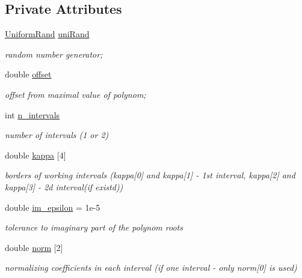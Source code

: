 \subsection*{Private Attributes}
\begin{DoxyCompactItemize}
\item 
\hyperlink{class_p_c_a_1_1_uniform_rand}{Uniform\+Rand} \hyperlink{class_p_c_a_1_1_double_well_rand_a44577274c594e30092748eb446d8dd40}{uni\+Rand}
\begin{DoxyCompactList}\small\item\em random number generator; \end{DoxyCompactList}\item 
double \hyperlink{class_p_c_a_1_1_double_well_rand_abad044e066c9b93b3eacb6d36440f650}{offset}
\begin{DoxyCompactList}\small\item\em offset from maximal value of polynom; \end{DoxyCompactList}\item 
int \hyperlink{class_p_c_a_1_1_double_well_rand_a89c48e652127b71600906d93f628dad5}{n\+\_\+intervals}
\begin{DoxyCompactList}\small\item\em number of intervals (1 or 2) \end{DoxyCompactList}\item 
double \hyperlink{class_p_c_a_1_1_double_well_rand_a4792680466fc8f865be362937b3e4e3b}{kappa} \mbox{[}4\mbox{]}
\begin{DoxyCompactList}\small\item\em borders of working intervals (kappa\mbox{[}0\mbox{]} and kappa\mbox{[}1\mbox{]} -\/ 1st interval, kappa\mbox{[}2\mbox{]} and kappa\mbox{[}3\mbox{]} -\/ 2d interval(if existd)) \end{DoxyCompactList}\item 
double \hyperlink{class_p_c_a_1_1_double_well_rand_a5fa2e0c609851d3e8a8cb9eb4bbd90c6}{im\+\_\+epsilon} = 1e-\/5
\begin{DoxyCompactList}\small\item\em tolerance to imaginary part of the polynom roots \end{DoxyCompactList}\item 
double \hyperlink{class_p_c_a_1_1_double_well_rand_aa31900946aeacdd5f462704393b93413}{norm} \mbox{[}2\mbox{]}
\begin{DoxyCompactList}\small\item\em normalizing coefficients in each interval (if one interval -\/ only norm\mbox{[}0\mbox{]} is used) \end{DoxyCompactList}\item 

\end{DoxyCompactItemize}
